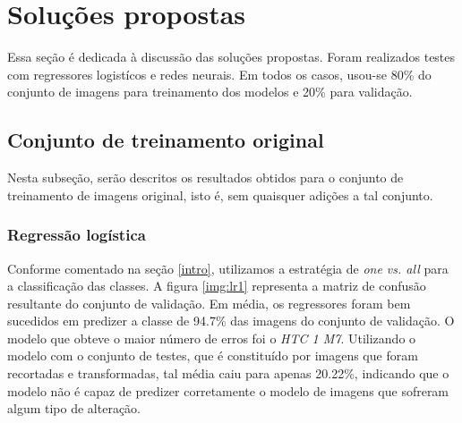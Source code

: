 \documentclass[10pt,twocolumn,letterpaper]{article}
\begin{document}
\section{Soluções propostas}

Essa seção é dedicada à discussão das soluções propostas. Foram realizados testes com regressores logistícos e redes neurais. Em todos os casos, usou-se 80\% do conjunto de imagens para treinamento dos modelos e 20\% para validação.

\subsection {Conjunto de treinamento original}

Nesta subseção, serão descritos os resultados obtidos para o conjunto de treinamento de imagens original, isto é, sem quaisquer adições a tal conjunto.

\subsubsection {Regressão logística}

Conforme comentado na seção \ref{intro}, utilizamos a estratégia de \textit{one vs. all} para a classificação das classes. A figura \ref{img:lr1} representa a matriz de confusão resultante do conjunto de validação. Em média, os regressores foram bem sucedidos em predizer a classe de 94.7\% das imagens do conjunto de validação. O modelo que obteve o maior número de erros foi o \textit{HTC 1 M7}. Utilizando o modelo com o conjunto de testes, que é constituído por imagens que foram recortadas e transformadas, tal média caiu para apenas 20.22\%, indicando que o modelo não é capaz de predizer corretamente o modelo de imagens que sofreram algum tipo de alteração.
\end{document}
